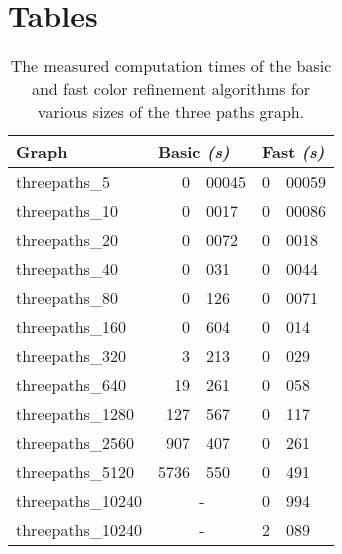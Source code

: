 \documentclass[twoside]{article}
\begin{document}
\begin{appendices}
\label{app}

\section{Tables} %
\label{app:tab}
\begin{table}[h]\centering
\begin{tabular}{|l|r@{.}l|r@{.}l|}
\hline
Graph	
	& \multicolumn{2}{l|}{Basic \emph{(s)}}
	& \multicolumn{2}{l|}{Fast \emph{(s)}} \\
\hline
threepaths\_{}5
	& 0 & 00045
	& 0	& 00059 \\
threepaths\_{}10
	& 0 & 0017
	& 0	& 00086 \\
threepaths\_{}20
	& 0 & 0072
	& 0	& 0018 \\
threepaths\_{}40
	& 0 & 031
	& 0	& 0044 \\
threepaths\_{}80
	& 0 & 126
	& 0	& 0071 \\
threepaths\_{}160
	& 0 & 604
	& 0	& 014 \\
threepaths\_{}320
	& 3 & 213
	& 0	& 029 \\
threepaths\_{}640
	& 19 & 261
	& 0	& 058 \\
threepaths\_{}1280
	& 127 & 567
	& 0	& 117 \\
threepaths\_{}2560
	& 907 & 407
	& 0	& 261 \\
threepaths\_{}5120
	& 5736 & 550
	& 0	& 491 \\
threepaths\_{}10240
	& \multicolumn{2}{c|}{-}
	& 0	& 994 \\
threepaths\_{}10240
	& \multicolumn{2}{c|}{-}
	& 2	& 089 \\

\hline
\end{tabular}
\caption{The measured computation times of the basic and fast color refinement algorithms for various sizes of the three paths graph.}
\label{table:measurements}
\end{table}

\end{appendices}
\end{document}
